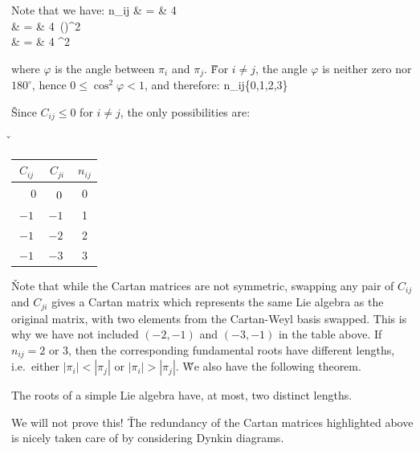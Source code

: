 Note that we have:
n_{ij} & = & 4\,\,
\\[5pt]
& = & 4\, \biggl(\biggr)^2\\[5pt]
& = & 4 \cos^2\varphi
\ei

where $\varphi$ is the angle between $\pi_i$ and $\pi_j$. \v

For $i\neq j$, the angle $\varphi$ is neither zero nor $180^\circ$, hence $0\leq \cos^2\varphi< 1$, and therefore:
\bse
n_{ij}\in \{0,1,2,3\}
\ese

\v

Since $C_{ij}\leq 0$ for $i\neq j$, the only possibilities are:

\v

\begin{center}
\begin{tabular}{ cc | c}
$C_{ij}$ & $C_{ji}$ & $n_{ij}$\\[2pt]
\hline
$\phantom{-}0$ & $\phantom{-}0\rule{0pt}{13pt}\ $ & 0 \\
$-1$ & $-1\ $ & 1 \\
$-1$ & $-2\ $ & 2 \\
$-1$ & $-3\ $ & 3
\end{tabular}
\end{center}

\v

Note that while the Cartan matrices are not symmetric, swapping any pair of $C_{ij}$ and $C_{ji}$ gives a Cartan
matrix which represents the same Lie algebra as the original matrix, with two elements from the Cartan-Weyl basis
swapped. This is why we have not included $(-2,-1)$ and $(-3,-1)$ in the table above. If $n_{ij}= 2$ or $3$, then the
corresponding fundamental roots have different lengths, i.e.\ either $|\pi_i|<|\pi_j|$ or $|\pi_i|>|\pi_j|$. \v

We also have the following theorem.

\bt[]
The roots of a simple Lie algebra have, at most, two distinct lengths.
\et

We will not prove this! \v

The redundancy of the Cartan matrices highlighted above is nicely taken care of by considering Dynkin diagrams.

